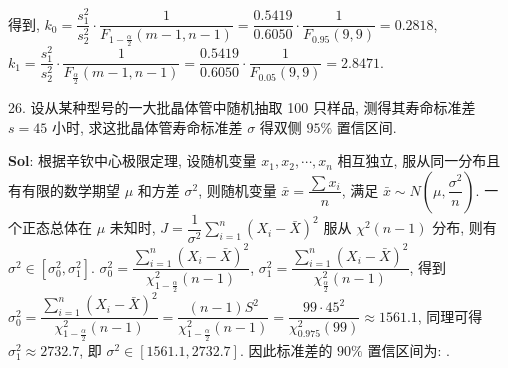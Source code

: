 得到, $k_0=\dfrac{s_1^2}{s_2^2}\cdot\dfrac{1}{F_{1-\frac{\alpha}{2}}(m-1,n-1)}=\dfrac{0.5419}{0.6050}\cdot\dfrac{1}{F_{0.95}(9,9)}=0.2818$, $k_1=\dfrac{s_1^2}{s_2^2}\cdot\dfrac{1}{F_{\frac{\alpha}{2}}(m-1,n-1)}=\dfrac{0.5419}{0.6050}\cdot\dfrac{1}{F_{0.05}(9,9)}=2.8471$.

\mybox{$[0.2818,2.8471]$}


\vspace{12pt}


26. 设从某种型号的一大批晶体管中随机抽取 100 只样品, 测得其寿命标准差 $s=45$ 小时, 求这批晶体管寿命标准差 $\sigma$ 得双侧 $95\%$ 置信区间.

\textbf{Sol}: 根据辛钦中心极限定理, 设随机变量 $x_1,x_2,\cdots,x_n$ 相互独立, 服从同一分布且有有限的数学期望 $\mu$ 和方差 $\sigma^2$, 则随机变量 $\bar{x}=\dfrac{\sum x_i}{n}$, 满足 $\bar{x}\sim N(\mu,\dfrac{\sigma^2}{n})$. 一个正态总体在 $\mu$ 未知时, $J=\dfrac{1}{\sigma^2}\sum_{i=1}^n(X_i-\bar{X})^2$ 服从 $\chi^2(n-1)$ 分布, 则有 $\sigma^2\in[\sigma_0^2,\sigma_1^2]$. $\sigma_0^2=\dfrac{\sum_{i=1}^n(X_i-\bar{X})^2}{\chi_{1-\frac{\alpha}{2}}^2(n-1)}$, $\sigma_1^2=\dfrac{\sum_{i=1}^n(X_i-\bar{X})^2}{\chi_{\frac{\alpha}{2}}^2(n-1)}$, 得到 $\sigma_0^2=\dfrac{\sum_{i=1}^n(X_i-\bar{X})^2}{\chi_{1-\frac{\alpha}{2}}^2(n-1)}=\dfrac{(n-1)S^2}{\chi_{1-\frac{\alpha}{2}}^2(n-1)}=\dfrac{99\cdot45^2}{\chi^2_{0.975}(99)}\approx1561.1$, 同理可得 $\sigma_1^2\approx2732.7$, 即 $\sigma^2\in[1561.1, 2732.7]$. 因此标准差的 $90\%$ 置信区间为:  \mybox{$\sigma\in[39.51, 52.28]$}.


\vspace{12pt}


